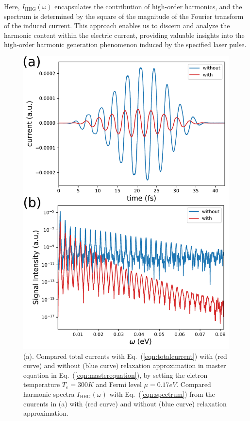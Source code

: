 Here, $I_{\mathrm{HHG}}(\omega)$ encapsulates the contribution of high-order harmonics, and the spectrum is determined by the square of the magnitude of the Fourier transform of the induced current. This approach enables us to discern and analyze the harmonic content within the electric current, providing valuable insights into the high-order harmonic generation phenomenon induced by the specified laser pulse.

\begin{figure}[htbp]
	\centering
	\includegraphics[width=0.8\linewidth]{pic/compare.pdf}
	\caption{\label{fig:compare}
		(a). Compared total currents with Eq.~(\ref{eqn:totalcurrent}) with (red curve) and without (blue curve) relaxation approximation in master equation in Eq.~(\ref{eqn:masterequation}), by setting the eletron temperature $T_e = 300 K$ and Fermi level $\mu = 0.17 eV$. Compared harmonic spectra $I_{\mathrm{HHG}}(\omega)$ with Eq.~(\ref{eqn:spectrum}) from the cuurents in (a) with (red curve) and without (blue curve) relaxation approximation.}
\end{figure}


